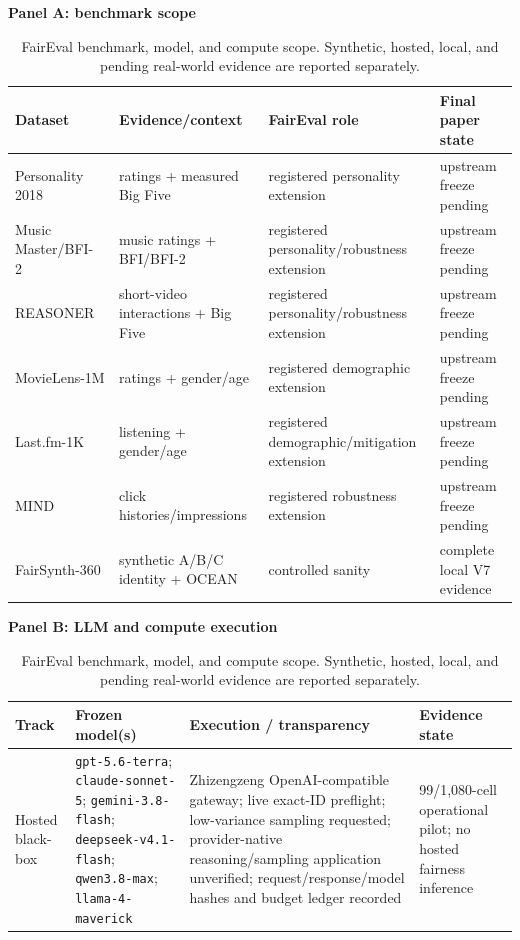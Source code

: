 \begin{table}[t]
\centering
\caption{FairEval benchmark, model, and compute scope. Synthetic, hosted, local, and pending real-world evidence are reported separately.}
\label{tab:benchmark-model-panel}
\scriptsize
\setlength{\tabcolsep}{2.4pt}
\renewcommand{\arraystretch}{1.08}

\textbf{Panel A: benchmark scope}\par\vspace{0.4mm}
\begin{tabular}{@{}p{2.35cm}p{3.80cm}p{2.05cm}p{3.20cm}@{}}
\toprule
Dataset & Evidence/context & FairEval role & Final paper state \\
\midrule
Personality 2018~\cite{nguyen2018personality} & ratings + measured Big Five & registered personality extension & upstream freeze pending \\
Music Master/BFI-2~\cite{klec2023bigfive} & music ratings + BFI/BFI-2 & registered personality/robustness extension & upstream freeze pending \\
REASONER~\cite{chen2023reasoner} & short-video interactions + Big Five & registered personality/robustness extension & upstream freeze pending \\
MovieLens-1M & ratings + gender/age & registered demographic extension & upstream freeze pending \\
Last.fm-1K & listening + gender/age & registered demographic/mitigation extension & upstream freeze pending \\
MIND~\cite{wu2020mind} & click histories/impressions & registered robustness extension & upstream freeze pending \\
FairSynth-360 & synthetic A/B/C identity + OCEAN & controlled sanity & complete local V7 evidence \\
\bottomrule
\end{tabular}

\vspace{1.0mm}
\textbf{Panel B: LLM and compute execution}\par\vspace{0.4mm}
\begin{tabular}{@{}p{1.55cm}p{3.40cm}p{4.25cm}p{2.35cm}@{}}
\toprule
Track & Frozen model(s) & Execution / transparency & Evidence state \\
\midrule
Hosted black-box
& \texttt{gpt-5.6-terra}; \texttt{claude-sonnet-5}; \texttt{gemini-3.8-flash}; \texttt{deepseek-v4.1-flash}; \texttt{qwen3.8-max}; \texttt{llama-4-maverick}
& Zhizengzeng OpenAI-compatible gateway; live exact-ID preflight; low-variance sampling requested; provider-native reasoning/sampling application unverified; request/response/model hashes and budget ledger recorded
& 99/1,080-cell operational pilot; no hosted fairness inference \\


\end{tabular}
\end{table}
